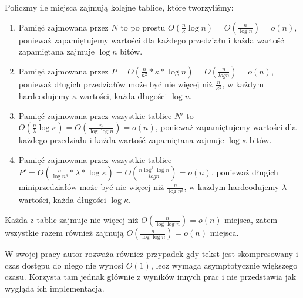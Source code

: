 \documentclass{article}
\begin{document}
Policzmy ile miejsca zajmują kolejne tablice, które tworzyliśmy:
\begin{enumerate}
    \item Pamięć zajmowana przez $N$ to po prostu $O(\frac{n}{\kappa}\log{n}) = O(\frac{n}{\log{n}}) = o(n)$, ponieważ zapamiętujemy wartości dla każdego przedziału i każda wartość zapamiętana zajmuje $\log{n}$ bitów.
    \item Pamięć zajmowana przez $P = O(\frac{n}{\kappa^2}*\kappa * \log{n}) = O(\frac{n}{log{n}}) = o(n)$, ponieważ długich przedziałów może być nie więcej niż $\frac{n}{\kappa^2}$, w każdym hardcodujemy $\kappa$ wartości, każda długości $\log{n}$.
    \item Pamięć zajmowana przez wszystkie tablice $N'$ to $O(\frac{n}{\lambda}\log{\kappa}) = O(\frac{n}{\log{\log{n}}}) = o(n)$, ponieważ zapamiętujemy wartości dla każdego przedziału i każda wartość zapamiętana zajmuje $\log{\kappa}$ bitów.
    \item Pamięć zajmowana przez wszystkie tablice $P' = O(\frac{n}{\log{n}^{\delta}}*\lambda * \log{\kappa}) = O(\frac{n \log^3{\log{n}}}{log{n}}) = o(n)$, ponieważ długich miniprzedziałów może być nie więcej niż $\frac{n}{\log{n}^{\delta}}$, w każdym hardcodujemy $\lambda$ wartości, każda długości $\log{\kappa}$.
\end{enumerate}

Każda z tablic zajmuje nie więcej niż $O(\frac{n}{\log{\log{n}}}) = o(n)$ miejsca, zatem wszystkie razem również zajmują $O(\frac{n}{\log{\log{n}}}) = o(n)$ miejsca.

W swojej pracy autor rozważa również przypadek gdy tekst jest skompresowany i czas dostępu do niego nie wynosi $O(1)$, lecz wymaga asymptotycznie większego czasu. Korzysta tam jednak głównie z wyników innych prac i nie przedstawia jak wygląda ich implementacja.
\end{document}
